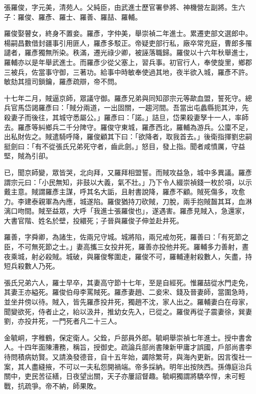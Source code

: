 \begin{pinyinscope}
張羅俊，字元美，清苑人。父純臣，由武進士歷官署參將、神機營左副將。生六子：羅俊、羅彥、羅士、羅善、羅喆、羅輔。

羅俊娶瞽女，終身不置妾。羅彥，字仲美，舉崇禎二年進士。累遷吏部文選郎中。楊嗣昌數借封疆事引用匪人，羅彥多駁正。帝疑吏部行私，廠卒常充庭，曹郎多罹譴者，羅彥獨無所染。秩滿，遷光祿少卿，被誣落職歸。羅俊以十六年秋舉進士，羅輔亦以是年舉武進士。而羅彥少從父塞上，習兵事。初官行人，奉使旋里，鄉郡三被兵，佐當事守御，三著功。給事中時敏奉使過其地，夜半欲入城，羅彥不許。敏劾其擅司鎖鑰，羅彥疏辯，帝不問。

十七年二月，賊逼京師，眾議守御。羅彥兄弟與同知邵宗元等歃血盟，誓死守。總兵官馬岱謁羅彥曰：「賊分兩道，一出固關，一趨河間。吾當出屯蠡縣扼其沖，先殺妻子而後往，其城守悉屬公。」羅彥曰：「諾。」詰旦，岱果殺妻孥十一人，率師去。羅彥等糾鄉兵二千分陴守。羅俊守東城，羅彥西北，羅輔為游兵。公廩不足，出私財佐之。賊遣騎呼降，羅俊顧其下曰：「欲降者，取我首去。」後衛指揮劉忠嗣挺劍曰：「有不從張氏兄弟死守者，齒此劍。」怒目，發上指。聞者咸憤厲，守益堅，賊為引卻。

已，聞京師變，眾皆哭，北向拜，又羅拜相盟誓。而賊攻益急，城中多異議。羅彥謂宗元曰：「小民無知，非鼓以大義，氣不壯。」乃下令人綴崇禎錢一枚於項，以示戴主意。賊謂羅彥主謀，呼其名大詬，且射書說降，羅彥不顧。賊死傷多，攻愈力。李建泰親軍為內應，城遂陷。羅俊猶持刀砍賊，刀脫，兩手抱賊齧其耳，血淋漓口吻間。賊至益眾，大呼「我進士張羅俊也」，遂遇害。羅彥見賊入，急還家，大書官階、姓名於壁，投繯死；子晉與羅俊子伸並赴井死。

羅善，字舜卿，為諸生，佐兩兄守城。城將陷，兩兄戒勿死，羅善曰：「有死節之臣，不可無死節之士。」妻高攜三女投井死，羅善亦投他井死。羅輔多力善射，晝夜乘城，射必殺賊。城破，與羅俊奪圍走，羅俊不可，羅輔連射殺數人，矢盡，持短兵殺數人乃死。

張氏兄弟六人，羅士早卒，其妻高守節十七年，至是自經死。惟羅喆從水門走免，其妻王亦縊死。羅俊伯母李罵賊死。羅彥妻趙、二妾宋、錢及晉妻師，當圍急時，並坐井傍以待。賊入，皆先羅彥投井死，獨趙不沈，家人出之。羅輔妻白在母家，聞變欲死，侍者止之，紿以汲井，推幼女先入，已從之。羅俊再從子震妻徐，巽妻劉，亦投井死，一門死者凡二十三人。

金毓峒，字稚鶴，保定衛人。父銓，戶部員外郎。毓峒舉崇禎七年進士。授中書舍人。十四年面陳漕務，稱旨，授御史。疏論兵部尚書陳新甲庸才誤國，戶部尚書李待問積病妨賢。又請渙發德音，自十五年始，蠲除繁苛，與海內更新。因言復社一案，其人盡縫掖，不可以一夫私怨開禍端。帝多採納。明年出按陜西。孫傳庭治兵關中，吏民苦征繕，日夜望出關，天子亦屢詔督趣。毓峒獨謂將驕卒悍，未可輕戰，抗疏爭。帝不納，師果敗。


\end{pinyinscope}
